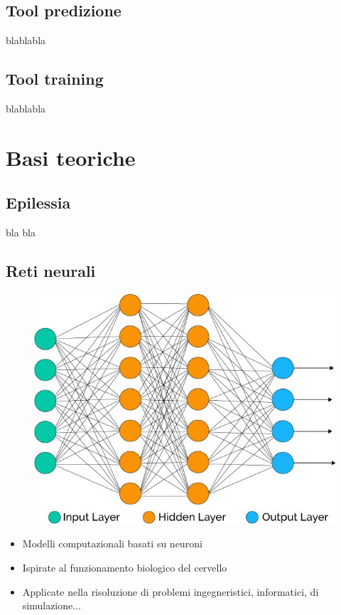 \documentclass[xcolor=x11names,compress, 
]{beamer}
\theoremstyle{definition} \newtheorem{esempio}{Esempio}
\theoremstyle{definition}
\begin{document}
	\subsection{Tool predizione}
		\begin{frame}{\subsecname}
			blablabla
		\end{frame}
	
	\subsection{Tool training}
		\begin{frame}{\subsecname}
			blablabla
		\end{frame}


\section{Basi teoriche}
	\subsection{Epilessia}
		\begin{frame}{\subsecname}
			bla bla
		\end{frame}
	
	\subsection{Reti neurali}
		\begin{frame}{\subsecname}
			\begin{figure}
				\includegraphics[scale=0.3]{immagini/linear}
			\end{figure}
			\begin{itemize}
				\item Modelli computazionali basati su neuroni
				\item Ispirate al funzionamento biologico del cervello
				\item Applicate nella risoluzione di problemi ingegneristici, informatici, di simulazione...
			\end{itemize}
		\end{frame}
		
\end{document}
